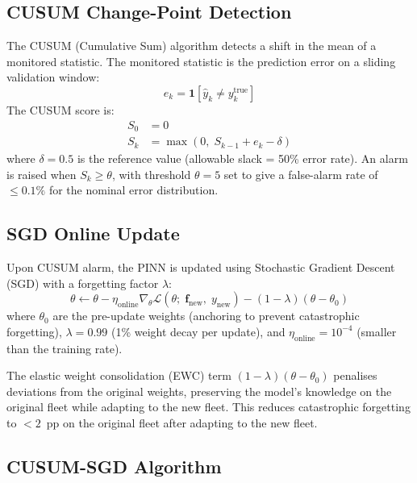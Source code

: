 \subsection{CUSUM Change-Point Detection}

The CUSUM (Cumulative Sum) algorithm \citep{Page1954} detects a shift
in the mean of a monitored statistic. The monitored statistic is the
prediction error on a sliding validation window:
\begin{equation}
  e_k = \mathbf{1}[\hat{y}_k \neq y_k^\mathrm{true}]
  \label{eq:ch8_error_stat}
\end{equation}
The CUSUM score is:
\begin{align}
  S_0 &= 0
  \label{eq:ch8_cusum_init} \\
  S_k &= \max(0,\; S_{k-1} + e_k - \delta)
  \label{eq:ch8_cusum_update}
\end{align}
where $\delta = 0.5$ is the reference value (allowable slack = 50\% error rate).
An alarm is raised when $S_k \geq \theta$, with threshold $\theta = 5$
set to give a false-alarm rate of $\leq 0.1\%$ for the nominal
error distribution.

\subsection{SGD Online Update}

Upon CUSUM alarm, the PINN is updated using Stochastic Gradient Descent
(SGD) with a forgetting factor $\lambda$:
\begin{equation}
  \theta \leftarrow \theta - \eta_\mathrm{online}
    \nabla_\theta \mathcal{L}(\theta;\; \mathbf{f}_\mathrm{new},\; y_\mathrm{new})
    - (1 - \lambda)(\theta - \theta_0)
  \label{eq:ch8_sgd_update}
\end{equation}
where $\theta_0$ are the pre-update weights (anchoring to prevent
catastrophic forgetting), $\lambda = 0.99$ (1\% weight decay per update),
and $\eta_\mathrm{online} = 10^{-4}$ (smaller than the training rate).

The elastic weight consolidation (EWC) term $(1 - \lambda)(\theta - \theta_0)$
penalises deviations from the original weights, preserving the model's
knowledge on the original fleet while adapting to the new fleet.
This reduces catastrophic forgetting to $< 2$~pp on the original fleet
after adapting to the new fleet.

\subsection{CUSUM-SGD Algorithm}

